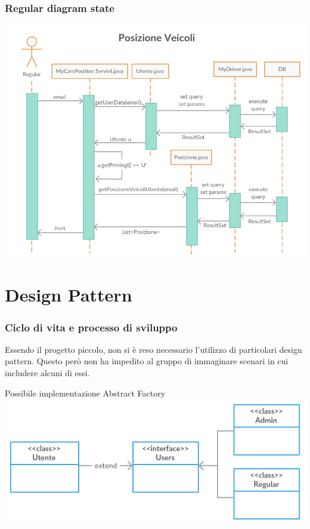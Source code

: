 \documentclass[a4paper,12pt]{beamer}
\begin{document}
\begin{frame}
\frametitle{Regular diagram state}
\includegraphics[scale=0.38]{RegularSeq.png}
\end{frame}

\pagebreak

\section{Design Pattern}
\begin{frame}
\frametitle{Ciclo di vita e processo di sviluppo}
Essendo il progetto piccolo, non si è reso necessario l'utilizzo di particolari design pattern. Questo però non ha impedito al gruppo di immaginare scenari in cui includere alcuni di essi. 

Possibile implementazione Abstract Factory
\includegraphics[scale=.5]{DesignPattern.png}
\end{frame}
\end{document}
